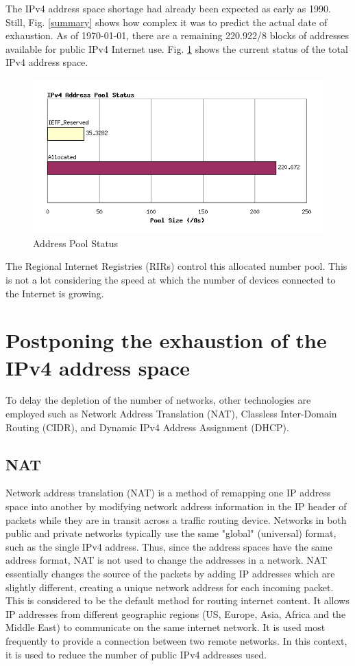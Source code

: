 \documentclass[conference,12pt]{IEEEtran}
\begin{document}
The IPv4 address space shortage had already been expected as early as 1990. Still, Fig. \ref{summary} shows how complex it was to predict the actual date of exhaustion. As of \today, there are a remaining 220.922/8 blocks of addresses available for public IPv4 Internet use. Fig. \ref{ipv4-current} shows the current status of the total IPv4 address space.
\begin{figure}[htbp]
\centerline{\includegraphics[scale=0.6]{resources/ipv4current.png}}
\caption{Address Pool Status}
\label{ipv4-current}
\end{figure}
The Regional Internet Registries (RIRs) control this allocated number pool. This is not a lot considering the speed at which the number of devices connected to the Internet is growing.

\section{Postponing the exhaustion of the IPv4 address space}

To delay the depletion of the number of networks, other technologies are employed such as Network Address Translation (NAT), Classless Inter-Domain Routing (CIDR), and Dynamic IPv4 Address Assignment (DHCP).

\subsection{NAT}
Network address translation (NAT) is a method of remapping one IP address space into another by modifying network address information in the IP header of packets while they are in transit across a traffic routing device. Networks in both public and private networks typically use the same "global" (universal) format, such as the single IPv4 address. Thus, since the address spaces have the same address format, NAT is not used to change the addresses in a network. NAT essentially changes the source of the packets by adding IP addresses which are slightly different, creating a unique network address for each incoming packet. This is considered to be the default method for routing internet content. It allows IP addresses from different geographic regions (US, Europe, Asia, Africa and the Middle East) to communicate on the same internet network. It is used most frequently to provide a connection between two remote networks. In this context, it is used to reduce the number of public IPv4 addresses used.
\end{document}

